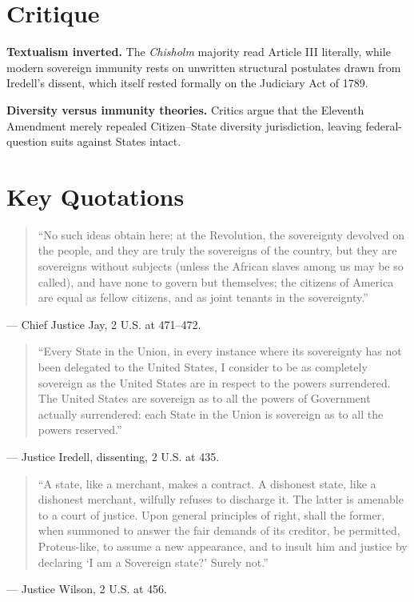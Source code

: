\documentclass[12pt]{article}
\begin{document}
\section{Critique}

\textbf{Textualism inverted.} The \emph{Chisholm} majority read Article III literally, while modern sovereign immunity rests on unwritten structural postulates drawn from Iredell's dissent, which itself rested formally on the Judiciary Act of 1789.

\textbf{Diversity versus immunity theories.} Critics argue that the Eleventh Amendment merely repealed Citizen--State diversity jurisdiction, leaving federal-question suits against States intact.

\section{Key Quotations}

\begin{quote}
``No such ideas obtain here; at the Revolution, the sovereignty devolved on the people, and they are truly the sovereigns of the country, but they are sovereigns without subjects (unless the African slaves among us may be so called), and have none to govern but themselves; the citizens of America are equal as fellow citizens, and as joint tenants in the sovereignty.''
\end{quote}
\noindent --- Chief Justice Jay, 2 U.S. at 471--472.

\begin{quote}
``Every State in the Union, in every instance where its sovereignty has not been delegated to the United States, I consider to be as completely sovereign as the United States are in respect to the powers surrendered. The United States are sovereign as to all the powers of Government actually surrendered: each State in the Union is sovereign as to all the powers reserved.''
\end{quote}
\noindent --- Justice Iredell, dissenting, 2 U.S. at 435.

\begin{quote}
``A state, like a merchant, makes a contract. A dishonest state, like a dishonest merchant, wilfully refuses to discharge it. The latter is amenable to a court of justice. Upon general principles of right, shall the former, when summoned to answer the fair demands of its creditor, be permitted, Proteus-like, to assume a new appearance, and to insult him and justice by declaring `I am a Sovereign state?' Surely not.''
\end{quote}
\noindent --- Justice Wilson, 2 U.S. at 456.
\end{document}
